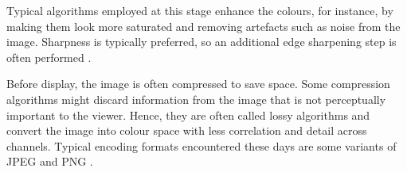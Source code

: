 Typical algorithms employed at this stage enhance the colours, for instance, by making them look more saturated and removing artefacts such as noise from the image. Sharpness is typically preferred, so an additional edge sharpening step is often performed  \cite[40-41]{Ramanath} \cite{4050037}.

Before display, the image is often compressed to save space. Some compression algorithms might discard information from the image that is not perceptually important to the viewer. Hence, they are often called lossy algorithms and convert the image into colour space with less correlation and detail across channels. Typical encoding formats encountered these days are some variants of JPEG \cite{JPEG} and PNG \cite{PNG}.


